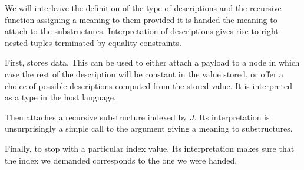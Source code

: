 We will interleave the definition of the type of descriptions and the
recursive function  assigning a meaning to them provided it
is handed the meaning to attach to the substructures. Interpretation
of descriptions gives rise to right-nested tuples terminated by equality
constraints.

\noindent\begin{minipage}{0.5\textwidth}
\end{minipage}\begin{minipage}{0.5\textwidth}
\end{minipage}

First,  stores data. This can be used to either attach a payload
to a node in which case the rest of the description will be constant in
the value stored, or offer a choice of possible descriptions computed
from the stored value. It is interpreted as a  type in the host language.

\noindent\begin{minipage}[t]{0.5\textwidth}
\end{minipage}\begin{minipage}[t]{0.5\textwidth}
\end{minipage}

Then  attaches a recursive substructure indexed by $J$. Its
interpretation is unsurprisingly a simple call to the argument giving
a meaning to substructures.

\noindent\begin{minipage}{0.5\textwidth}
\end{minipage}\begin{minipage}{0.5\textwidth}
\end{minipage}

Finally,  to stop with a particular index value.
Its interpretation makes sure that the index we demanded corresponds
to the one we were handed.

\noindent\begin{minipage}{0.5\textwidth}
\end{minipage}\begin{minipage}{0.5\textwidth}
\end{minipage}

